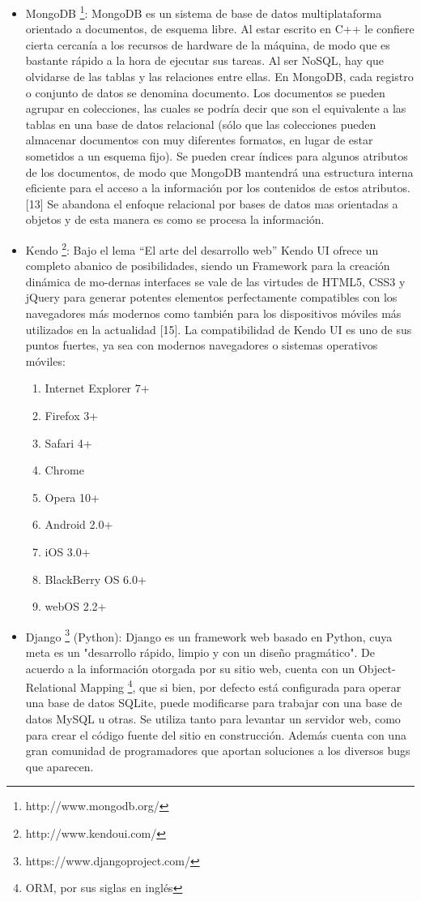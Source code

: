\begin{itemize}
 \item MongoDB \footnote{http://www.mongodb.org/}: MongoDB es un sistema de base de datos
  multiplataforma orientado a documentos, de esquema libre. Al estar escrito en C++ le confiere cierta 
  cercanía a los recursos de hardware de la máquina, de modo que es bastante rápido a la hora de 
  ejecutar sus tareas. Al ser NoSQL, hay que olvidarse de las tablas y las relaciones entre ellas.
  En MongoDB, cada registro o conjunto de datos se denomina documento. Los documentos se pueden 
  agrupar en colecciones, las cuales se  podría decir que son el equivalente a las tablas en una base 
  de datos relacional (sólo que las colecciones pueden almacenar documentos con muy diferentes formatos, 
  en lugar de estar sometidos a un esquema fijo). Se pueden crear índices para algunos atributos de los 
  documentos, de modo que MongoDB mantendrá una estructura interna eficiente para el acceso a la información 
  por los contenidos de estos atributos. [13] Se abandona el enfoque relacional por bases de datos mas 
  orientadas a objetos y de esta manera es como se procesa la información.
 
 \item Kendo \footnote{http://www.kendoui.com/}: Bajo el lema “El arte del desarrollo web” Kendo UI 
  ofrece un completo abanico de posibilidades, siendo un Framework para la creación dinámica de mo-dernas 
  interfaces se vale de las virtudes de HTML5, CSS3 y jQuery para generar potentes elementos perfectamente 
  compatibles con los navegadores más modernos como también para los dispositivos móviles más utilizados 
  en la actualidad [15]. La compatibilidad de Kendo UI es uno de sus puntos fuertes, ya sea con modernos 
  navegadores o sistemas operativos móviles:
  \begin{enumerate}
   \item Internet Explorer 7+
   \item Firefox 3+
   \item Safari 4+
   \item Chrome
   \item Opera 10+
   \item Android 2.0+
   \item iOS 3.0+
   \item BlackBerry OS 6.0+
   \item webOS 2.2+
  \end{enumerate}
 
 \item Django \footnote{https://www.djangoproject.com/} (Python): Django es un framework web basado en Python,
  cuya meta es un "desarrollo rápido, limpio y con un diseño pragmático". De acuerdo a la información
  otorgada por su sitio web, cuenta con un Object-Relational Mapping \footnote{ORM, por sus siglas en inglés},
  que si bien, por defecto está configurada para operar una base de datos SQLite, puede modificarse para 
  trabajar con una base de datos MySQL u otras. Se utiliza tanto para levantar un servidor web, como para 
  crear el código fuente del sitio en construcción. Además cuenta con una gran comunidad de programadores que
  aportan soluciones a los diversos bugs que aparecen.


\end{itemize}
